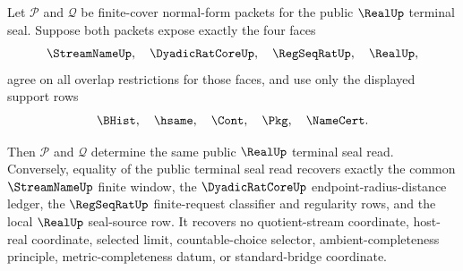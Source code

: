 \begin{theorem}
\label{thm:real-terminal-seal-four-face-cover-descent-determinacy}
Let $\mathcal P$ and $\mathcal Q$ be finite-cover normal-form packets for the
public $\RealUp$ terminal seal. Suppose both packets expose exactly the four
faces
$$
\StreamNameUp,\quad \DyadicRatCoreUp,\quad \RegSeqRatUp,\quad \RealUp,
$$
agree on all overlap restrictions for those faces, and use only the displayed
support rows
$$
\BHist,\quad \hsame,\quad \Cont,\quad \Pkg,\quad \NameCert.
$$

Then $\mathcal P$ and $\mathcal Q$ determine the same public $\RealUp$
terminal seal read. Conversely, equality of the public terminal seal read
recovers exactly the common $\StreamNameUp$ finite window, the
$\DyadicRatCoreUp$ endpoint-radius-distance ledger, the $\RegSeqRatUp$
finite-request classifier and regularity rows, and the local $\RealUp$
seal-source row. It recovers no quotient-stream coordinate, host-real
coordinate, selected limit, countable-choice selector, ambient-completeness
principle, metric-completeness datum, or standard-bridge coordinate.
\end{theorem}
